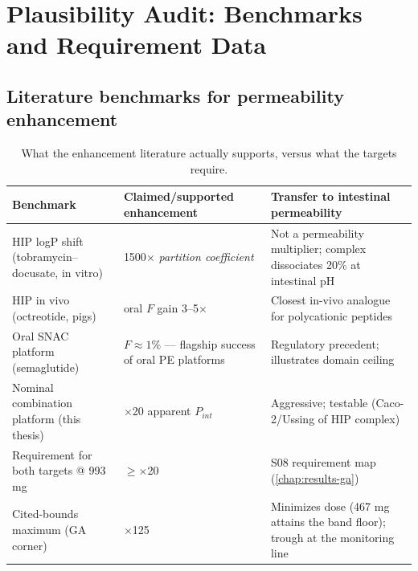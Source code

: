 \chapter{Plausibility Audit: Benchmarks and Requirement Data}
\label{chap:app-audit}

\section{Literature benchmarks for permeability enhancement}
\begin{table}[htbp]
\centering
\caption{What the enhancement literature actually supports, versus what the targets require.}
\label{tab:app-benchmarks}
\small
\begin{tabular}{p{4.6cm}p{3.4cm}p{5.4cm}}
\toprule
Benchmark & Claimed/supported enhancement & Transfer to intestinal permeability \\
\midrule
HIP logP shift (tobramycin--docusate, in vitro) & 1500$\times$ \emph{partition coefficient} \citep{Asad2023} & Not a permeability multiplier; complex dissociates 20\% at intestinal pH \\
HIP in vivo (octreotide, pigs) & oral $F$ gain 3--5$\times$ \citep{Bonengel2018} & Closest in-vivo analogue for polycationic peptides \\
Oral SNAC platform (semaglutide) & $F \approx 1\%$ --- flagship success of oral PE platforms & Regulatory precedent; illustrates domain ceiling \\
Nominal combination platform (this thesis) & $\times$20 apparent $P_{int}$ & Aggressive; testable (Caco-2/Ussing of HIP complex) \\
Requirement for both targets @ 993 mg & $\geq\times$20 & S08 requirement map (\cref{chap:results-ga}) \\
Cited-bounds maximum (GA corner) & $\times$125 & Minimizes dose (467 mg attains the band floor); trough at the monitoring line \\
\bottomrule
\end{tabular}
\end{table}

